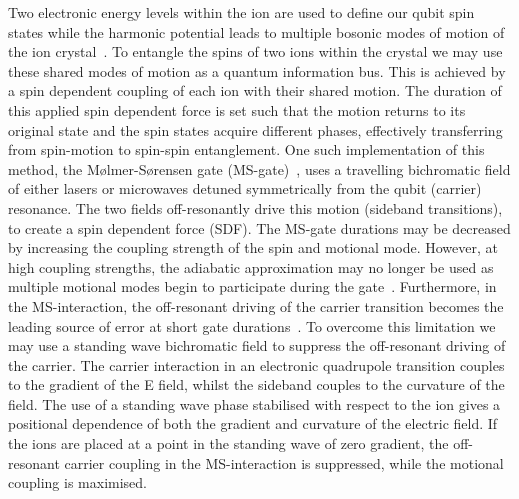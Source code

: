 \documentclass[12pt]{iopart}
\begin{document}
Two electronic energy levels within the ion are used to define our
qubit spin states while the harmonic potential leads to multiple
bosonic modes of motion of the ion crystal~\cite{wineland_experimental_1998}. To entangle the
spins of two ions within the crystal we may use these shared modes
of motion as a quantum information bus. This is achieved by a spin
dependent coupling of each ion with their shared motion.
The duration of this applied spin dependent force is set such that the
motion returns to its original state and the spin states
acquire different phases, effectively transferring from
spin-motion to spin-spin entanglement. One such implementation of
this method, the M\o lmer-S\o rensen gate (MS-gate)~\cite{sorensen_entanglement_2000}, uses a
travelling bichromatic field of either lasers or microwaves
detuned symmetrically from the qubit (carrier) resonance.
The two fields off-resonantly drive this motion (sideband
transitions), to create a spin dependent force (SDF).
The MS-gate durations may be decreased by increasing the coupling
strength of the spin and motional mode. However, at high coupling strengths, the adiabatic
approximation may no longer be used as multiple motional modes begin
to participate during the gate~\cite{schafer_fast_2018, schafer_fast_2020}.
Furthermore, in the MS-interaction, the off-resonant driving of the
carrier transition becomes the
leading source of error at short gate durations~\cite{saner_breaking_2023}. To overcome
this limitation we may use a standing wave bichromatic field to
suppress the off-resonant driving of the carrier. The carrier
interaction in an electronic quadrupole transition couples to the
gradient of the E field, whilst the sideband couples to the
curvature of the field. The use of a standing wave phase stabilised with
respect to the ion gives a positional dependence of both the
gradient and curvature of the electric field. If the ions are
placed at a point in the standing wave of zero gradient, the off-resonant carrier coupling in the MS-interaction is suppressed, while the motional coupling is maximised.
\end{document}
